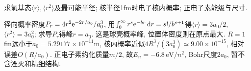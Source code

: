 \begin{exercise}求氢基态$\langle r\rangle,\langle r^2\rangle$及最可能半径; 核半径1fm时电子核内概率; 正电子素能级与尺寸.\end{exercise}
\begin{solution}径向概率密度$P_r=4r^2\mathrm e^{-2r/a_0}/a_0^3$, 用$\int_0^\infty r^s\mathrm e^{-br}\,\mathrm d r=s!/b^{s+1}$得$\langle r\rangle=3a_0/2$, $\langle r^2\rangle=3a_0^2$; 求导$P_r$得峰$r=a_0$. 这是球壳概率峰, 位置体密度则在原点最大. $R=1$fm远小于$a_0=5.29177\times10^{-11}$m, 核内概率近似$4R^3/(3a_0^3)\simeq9.00\times10^{-15}$, 相对误差$O(R/a_0)$. 正电子素约化质量$m/2$, 故$E_n=-6.8\,\mathrm{eV}/n^2$, Bohr尺度$2a_0$, 暂不含湮灭和精细结构.\end{solution}
